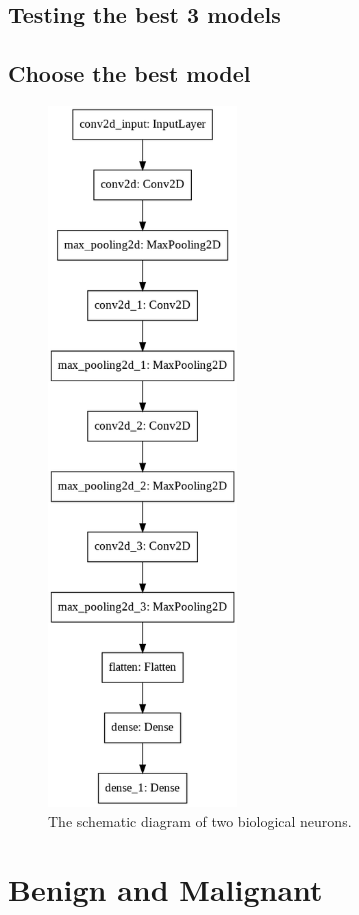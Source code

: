 \documentclass{book}
\begin{document}
            \subsection{Testing the best 3 models}
            \subsection{Choose the best model}


        


        \begin{figure}[h]
            \centering
            \includegraphics[width=5cm]{smc-best-model.png}
            \caption{The schematic diagram of two biological neurons.}\label{fig:neurons}
        \end{figure}

        \section{Benign and Malignant}  %
\end{document}
